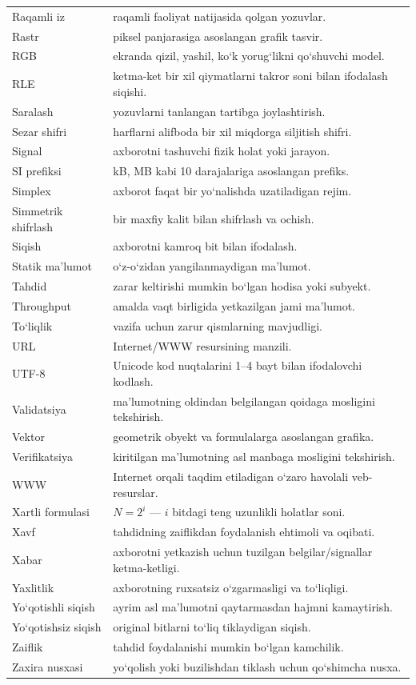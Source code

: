 \documentclass[11pt,a4paper,oneside]{book}
\begin{document}
\begin{longtable}{@{}L{38mm}L{127mm}@{}}
Raqamli iz & raqamli faoliyat natijasida qolgan yozuvlar.\\
Rastr & piksel panjarasiga asoslangan grafik tasvir.\\
RGB & ekranda qizil, yashil, ko‘k yorug‘likni qo‘shuvchi model.\\
RLE & ketma-ket bir xil qiymatlarni takror soni bilan ifodalash siqishi.\\
Saralash & yozuvlarni tanlangan tartibga joylashtirish.\\
Sezar shifri & harflarni alifboda bir xil miqdorga siljitish shifri.\\
Signal & axborotni tashuvchi fizik holat yoki jarayon.\\
SI prefiksi & kB, MB kabi 10 darajalariga asoslangan prefiks.\\
Simplex & axborot faqat bir yo‘nalishda uzatiladigan rejim.\\
Simmetrik shifrlash & bir maxfiy kalit bilan shifrlash va ochish.\\
Siqish & axborotni kamroq bit bilan ifodalash.\\
Statik ma’lumot & o‘z-o‘zidan yangilanmaydigan ma’lumot.\\
Tahdid & zarar keltirishi mumkin bo‘lgan hodisa yoki subyekt.\\
Throughput & amalda vaqt birligida yetkazilgan jami ma’lumot.\\
To‘liqlik & vazifa uchun zarur qismlarning mavjudligi.\\
URL & Internet/WWW resursining manzili.\\
UTF-8 & Unicode kod nuqtalarini 1–4 bayt bilan ifodalovchi kodlash.\\
Validatsiya & ma’lumotning oldindan belgilangan qoidaga mosligini tekshirish.\\
Vektor & geometrik obyekt va formulalarga asoslangan grafika.\\
Verifikatsiya & kiritilgan ma’lumotning asl manbaga mosligini tekshirish.\\
WWW & Internet orqali taqdim etiladigan o‘zaro havolali veb-resurslar.\\
Xartli formulasi & \(N=2^i\) — \(i\) bitdagi teng uzunlikli holatlar soni.\\
Xavf & tahdidning zaiflikdan foydalanish ehtimoli va oqibati.\\
Xabar & axborotni yetkazish uchun tuzilgan belgilar/signallar ketma-ketligi.\\
Yaxlitlik & axborotning ruxsatsiz o‘zgarmasligi va to‘liqligi.\\
Yo‘qotishli siqish & ayrim asl ma’lumotni qaytarmasdan hajmni kamaytirish.\\
Yo‘qotishsiz siqish & original bitlarni to‘liq tiklaydigan siqish.\\
Zaiflik & tahdid foydalanishi mumkin bo‘lgan kamchilik.\\
Zaxira nusxasi & yo‘qolish yoki buzilishdan tiklash uchun qo‘shimcha nusxa.\\
\bottomrule
\end{longtable}
\normalsize
\end{document}

